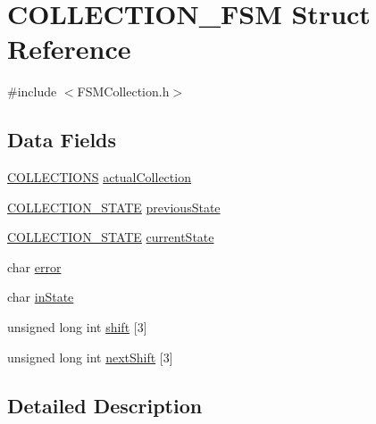 \hypertarget{struct_c_o_l_l_e_c_t_i_o_n___f_s_m}{}\section{C\+O\+L\+L\+E\+C\+T\+I\+O\+N\+\_\+\+F\+SM Struct Reference}
\label{struct_c_o_l_l_e_c_t_i_o_n___f_s_m}


{\ttfamily \#include $<$F\+S\+M\+Collection.\+h$>$}

\subsection*{Data Fields}
\begin{DoxyCompactItemize}
\item 
\mbox{\hyperlink{_f_s_m_collection_8h_a25f9142504106abec10ec63d2a9be4cd}{C\+O\+L\+L\+E\+C\+T\+I\+O\+NS}} \mbox{\hyperlink{struct_c_o_l_l_e_c_t_i_o_n___f_s_m_af0b5fddc2780f2bf9cfc3273f168c136}{actual\+Collection}}
\item 
\mbox{\hyperlink{_f_s_m_collection_8h_a1ffa02d402e882e4716ee5d2884de8a8}{C\+O\+L\+L\+E\+C\+T\+I\+O\+N\+\_\+\+S\+T\+A\+TE}} \mbox{\hyperlink{struct_c_o_l_l_e_c_t_i_o_n___f_s_m_afe2d0f5638341ceb93aaec46c3f3f951}{previous\+State}}
\item 
\mbox{\hyperlink{_f_s_m_collection_8h_a1ffa02d402e882e4716ee5d2884de8a8}{C\+O\+L\+L\+E\+C\+T\+I\+O\+N\+\_\+\+S\+T\+A\+TE}} \mbox{\hyperlink{struct_c_o_l_l_e_c_t_i_o_n___f_s_m_af752ed6a0e02935007418c41b172ad49}{current\+State}}
\item 
char \mbox{\hyperlink{struct_c_o_l_l_e_c_t_i_o_n___f_s_m_a1b39a1a9b9888563c380903bcba6ecf4}{error}}
\item 
char \mbox{\hyperlink{struct_c_o_l_l_e_c_t_i_o_n___f_s_m_a3c3253f225f622698d3c4b407d0b262b}{in\+State}}
\item 
unsigned long int \mbox{\hyperlink{struct_c_o_l_l_e_c_t_i_o_n___f_s_m_a7585ec4845287803e9a17e66d0c453a4}{shift}} \mbox{[}3\mbox{]}
\item 
unsigned long int \mbox{\hyperlink{struct_c_o_l_l_e_c_t_i_o_n___f_s_m_a2da71573be83423ba22c8d104580b270}{next\+Shift}} \mbox{[}3\mbox{]}
\end{DoxyCompactItemize}


\subsection{Detailed Description}


